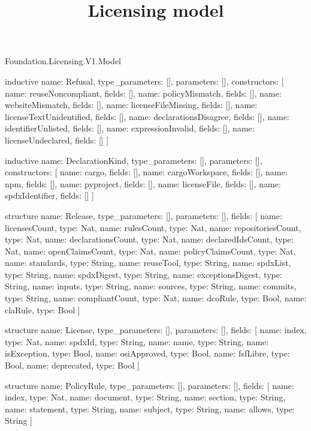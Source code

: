 \begin{lexlean}{Foundation.Licensing.V1.Model}
\title{Licensing model}
\begin{semanticmodule}
inductive{
  name: Refusal,
  type_parameters: [],
  parameters: [],
  constructors: [
    {name: reuseNoncompliant, fields: []},
    {name: policyMismatch, fields: []},
    {name: websiteMismatch, fields: []},
    {name: licenseFileMissing, fields: []},
    {name: licenseTextUnidentified, fields: []},
    {name: declarationsDisagree, fields: []},
    {name: identifierUnlisted, fields: []},
    {name: expressionInvalid, fields: []},
    {name: licenseUndeclared, fields: []}
  ]
}

inductive{
  name: DeclarationKind,
  type_parameters: [],
  parameters: [],
  constructors: [
    {name: cargo, fields: []},
    {name: cargoWorkspace, fields: []},
    {name: npm, fields: []},
    {name: pyproject, fields: []},
    {name: licenseFile, fields: []},
    {name: spdxIdentifier, fields: []}
  ]
}

structure{
  name: Release,
  type_parameters: [],
  parameters: [],
  fields: [
    {name: licensesCount, type: Nat},
    {name: rulesCount, type: Nat},
    {name: repositoriesCount, type: Nat},
    {name: declarationsCount, type: Nat},
    {name: declaredIdsCount, type: Nat},
    {name: openClaimsCount, type: Nat},
    {name: policyClaimsCount, type: Nat},
    {name: standards, type: String},
    {name: reuseTool, type: String},
    {name: spdxList, type: String},
    {name: spdxDigest, type: String},
    {name: exceptionsDigest, type: String},
    {name: inputs, type: String},
    {name: sources, type: String},
    {name: commits, type: String},
    {name: compliantCount, type: Nat},
    {name: dcoRule, type: Bool},
    {name: claRule, type: Bool}
  ]
}

structure{
  name: License,
  type_parameters: [],
  parameters: [],
  fields: [
    {name: index, type: Nat},
    {name: spdxId, type: String},
    {name: name, type: String},
    {name: isException, type: Bool},
    {name: osiApproved, type: Bool},
    {name: fsfLibre, type: Bool},
    {name: deprecated, type: Bool}
  ]
}

structure{
  name: PolicyRule,
  type_parameters: [],
  parameters: [],
  fields: [
    {name: index, type: Nat},
    {name: document, type: String},
    {name: section, type: String},
    {name: statement, type: String},
    {name: subject, type: String},
    {name: allows, type: String}
  ]
}


\end{semanticmodule}
\end{lexlean}
